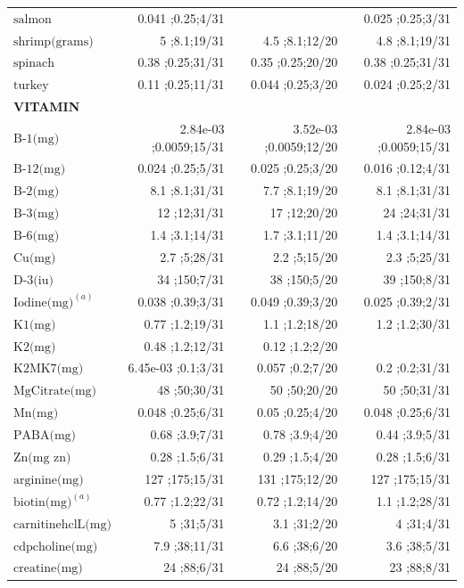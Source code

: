 \begin{table}[H]
\begin{tabular}{|l|r|r|r|}
$\textrm{salmon}$&0.041 ;0.25;4/31&&0.025 ;0.25;3/31\\
$\textrm{shrimp(grams)}$&5 ;8.1;19/31&4.5 ;8.1;12/20&4.8 ;8.1;19/31\\
$\textrm{spinach}$&0.38 ;0.25;31/31&0.35 ;0.25;20/20&0.38 ;0.25;31/31\\
$\textrm{turkey}$&0.11 ;0.25;11/31&0.044 ;0.25;3/20&0.024 ;0.25;2/31\\
{\bf VITAMIN}&&&\\
$\textrm{B-1(mg)}$&2.84e-03 ;0.0059;15/31&3.52e-03 ;0.0059;12/20&2.84e-03 ;0.0059;15/31\\
$\textrm{B-12(mg)}$&0.024 ;0.25;5/31&0.025 ;0.25;3/20&0.016 ;0.12;4/31\\
$\textrm{B-2(mg)}$&8.1 ;8.1;31/31&7.7 ;8.1;19/20&8.1 ;8.1;31/31\\
$\textrm{B-3(mg)}$&12 ;12;31/31&17 ;12;20/20&24 ;24;31/31\\
$\textrm{B-6(mg)}$&1.4 ;3.1;14/31&1.7 ;3.1;11/20&1.4 ;3.1;14/31\\
$\textrm{Cu(mg)}$&2.7 ;5;28/31&2.2 ;5;15/20&2.3 ;5;25/31\\
$\textrm{D-3(iu)}$&34 ;150;7/31&38 ;150;5/20&39 ;150;8/31\\
$\textrm{Iodine(mg)}^{\left(a\right)}$&0.038 ;0.39;3/31&0.049 ;0.39;3/20&0.025 ;0.39;2/31\\
$\textrm{K1(mg)}$&0.77 ;1.2;19/31&1.1 ;1.2;18/20&1.2 ;1.2;30/31\\
$\textrm{K2(mg)}$&0.48 ;1.2;12/31&0.12 ;1.2;2/20&\\
$\textrm{K2MK7(mg)}$&6.45e-03 ;0.1;3/31&0.057 ;0.2;7/20&0.2 ;0.2;31/31\\
$\textrm{MgCitrate(mg)}$&48 ;50;30/31&50 ;50;20/20&50 ;50;31/31\\
$\textrm{Mn(mg)}$&0.048 ;0.25;6/31&0.05 ;0.25;4/20&0.048 ;0.25;6/31\\
$\textrm{PABA(mg)}$&0.68 ;3.9;7/31&0.78 ;3.9;4/20&0.44 ;3.9;5/31\\
$\textrm{Zn(mg~zn)}$&0.28 ;1.5;6/31&0.29 ;1.5;4/20&0.28 ;1.5;6/31\\
$\textrm{arginine(mg)}$&127 ;175;15/31&131 ;175;12/20&127 ;175;15/31\\
$\textrm{biotin(mg)}^{\left(a\right)}$&0.77 ;1.2;22/31&0.72 ;1.2;14/20&1.1 ;1.2;28/31\\
$\textrm{carnitinehclL(mg)}$&5 ;31;5/31&3.1 ;31;2/20&4 ;31;4/31\\
$\textrm{cdpcholine(mg)}$&7.9 ;38;11/31&6.6 ;38;6/20&3.6 ;38;5/31\\
$\textrm{creatine(mg)}$&24 ;88;6/31&24 ;88;5/20&23 ;88;8/31\\

\end{tabular}
\end{table}

